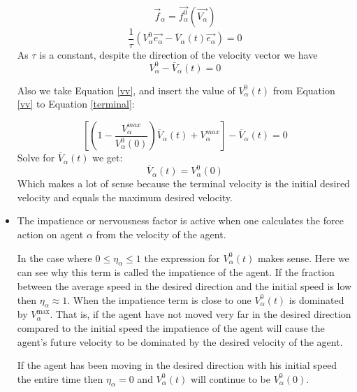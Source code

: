 \begin{itemize}
\begin{equation}
\vec{f}_{\alpha} = \vec{f^{0}_{\alpha}}\left( \vec{V_{\alpha}} \right)
\end{equation}
\begin{equation}
\frac{1}{\tau}\left( V_{\alpha}^{0} \vec{e_{\alpha}} - \overline{V}_{\alpha} \left( t\right) \vec{e_{\alpha}}  \right)  = 0
\end{equation}
As $ \tau $ is a constant, despite the direction of the velocity vector we have
\begin{equation}\label{terminal}
	 V_{\alpha}^{0} - \overline{V}_{\alpha} \left( t\right) 
    = 0
\end{equation}

Also we take Equation \ref{vv}, and insert the value of $ V_{\alpha}^{0}(t) $ from Equation \ref{vv} to Equation \ref{terminal}:

\begin{equation}
	\left[ \left( 1 - \frac{V_{\alpha}^{max}}{V_{\alpha}^{0}(0)}\right)\overline{V}_{\alpha} \left( t \right) + V_{\alpha}^{max} \right] - \overline{V}_{\alpha} \left( t\right) 
    = 0
\end{equation}
Solve for $ \overline{V}_{\alpha} \left( t\right) $ we get:
\begin{equation}
\overline{V}_{\alpha} \left( t\right) = V_{\alpha}^{0}(0)
\end{equation}
Which makes a lot of sense because the terminal velocity is the initial desired velocity and equals the maximum desired velocity.

\item The impatience or nervousness factor is active when one calculates the 
force action on agent $\alpha$ from the velocity of the agent.

In the case where $0 \leq \eta_{\alpha} \leq 1$ the expression for 
$V_{\alpha}^{0} \left( t \right)$  makes sense. Here we can see why this term 
is called the impatience of the agent. If the fraction  between the average 
speed in the desired direction and the initial speed is low then $\eta_{\alpha} \approx 1$. 
When the impatience term is close to one $V_{\alpha}^{0} \left( t \right)$ 
is dominated by $V_{\alpha}^{\text{max}}$. That is, if the agent have not 
moved very far in the desired direction compared to the initial speed the 
impatience of the agent will cause the agent's future velocity to be dominated by 
the desired velocity of the agent.

If the agent has been moving in the desired direction with his initial 
speed the entire time then $\eta_{\alpha} = 0$  and 
$V_{\alpha}^{0} \left( t \right)$ will continue to be $V_{\alpha}^{0} \left( 0 \right)$.


\end{itemize}
